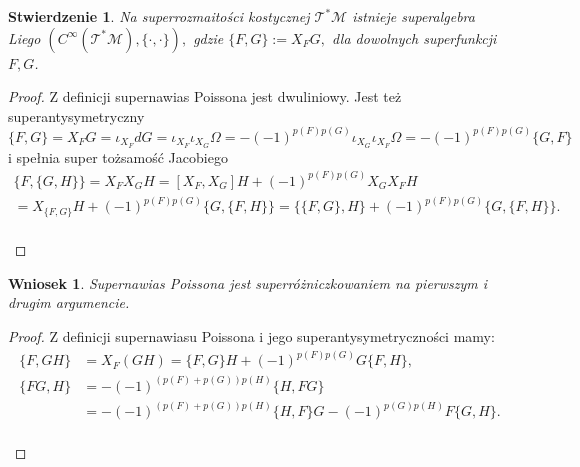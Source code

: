 \documentclass[11pt,a4paper]{report}
\newtheorem{corollary}[theorem]{Wniosek}
\newtheorem{proposition}[theorem]{Stwierdzenie}
\theoremstyle{definition}
\begin{document}
\begin{proposition}
 Na superrozmaitości kostycznej $\mathcal{T^*M}$ istnieje superalgebra Liego $(C^\infty (\mathcal{T^*M}), \{\cdot , \cdot \}),$ gdzie $\{ F, G \} := X_F G,$ dla dowolnych superfunkcji $F,G$.
\end{proposition}

\begin{proof}
 Z definicji supernawias Poissona jest dwuliniowy. Jest też superantysymetryczny
 \begin{equation*}
  \{ F,G \} = X_F G = \iota_{X_F} dG = \iota_{X_F} \iota_{X_G} \Omega = -(-1)^{p(F)p(G)} \iota_{X_G} \iota_{X_F} \Omega = -(-1)^{p(F)p(G)} \{ G, F \}
 \end{equation*}
 i spełnia super tożsamość Jacobiego
 \begin{equation*}
 \begin{gathered}
  \{F, \{G, H \} \} = X_F X_G H = [X_F, X_G] H + (-1)^{p(F)p(G)} X_G X_F H \\ 
  = X_{\{F,G\}} H + (-1)^{p(F)p(G)} \{G, \{F, H \} \}
  = \{ \{F, G\}, H \} + (-1)^{p(F)p(G)} \{G, \{F, H \} \}.
 \end{gathered}
 \end{equation*} \\[-29.5pt]
\end{proof}

\begin{corollary}
 Supernawias Poissona jest superróżniczkowaniem na pierwszym i drugim argumencie.
 \end{corollary}
 
\begin{proof}
Z definicji supernawiasu Poissona i jego superantysymetryczności mamy:
 \begin{equation*}
 \begin{aligned}
  \{ F, GH \} &= X_F (GH) = \{F,G\} H + (-1)^{p(F)p(G)} G \{ F,H\}, \\
  \{ FG, H \} &= - (-1)^{(p(F)+p(G))p(H)} \{ H, FG \}  \\ 
  &= -(-1)^{(p(F) + p(G))p(H)}\{H,F\}G -(-1)^{p(G)p(H)} F\{G,H\}.
 \end{aligned}
 \end{equation*}\\[-27pt]
\end{proof}
\end{document}
